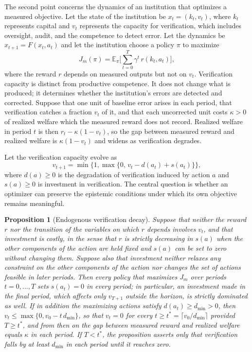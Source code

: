 \documentclass[11pt]{article}
\newtheorem{proposition}{Proposition}
\theoremstyle{definition}
\theoremstyle{remark}
\newcommand{\E}{\mathbb{E}}
\begin{document}
The second point concerns the dynamics of an institution that optimizes a measured objective. Let the state of the institution be $x_t=(k_t,v_t)$, where $k_t$ represents capital and $v_t$ represents the capacity for verification, which includes oversight, audit, and the competence to detect error. Let the dynamics be $x_{t+1}=F(x_t,a_t)$ and let the institution choose a policy $\pi$ to maximize
\begin{equation}
J_m(\pi)=\E_\pi\Big[\sum_{t=0}^{T}\gamma^{t}\,r(k_t,a_t)\Big],
\end{equation}
where the reward $r$ depends on measured outputs but not on $v_t$. Verification capacity is distinct from productive competence. It does not change what is produced; it determines whether the institution's errors are detected and corrected. Suppose that one unit of baseline error arises in each period, that verification catches a fraction $v_t$ of it, and that each uncorrected unit costs $\kappa>0$ of realized welfare which the measured reward does not record. Realized welfare in period $t$ is then $r_t-\kappa(1-v_t)$, so the gap between measured reward and realized welfare is $\kappa(1-v_t)$ and widens as verification degrades.

Let the verification capacity evolve as
\begin{equation}
v_{t+1}=\min\{1,\max\{0,\,v_t-d(a_t)+s(a_t)\}\},
\end{equation}
where $d(a)\ge0$ is the degradation of verification induced by action $a$ and $s(a)\ge0$ is investment in verification. The central question is whether an optimizer can preserve the epistemic conditions under which its own objective remains meaningful.

\begin{proposition}[Endogenous verification decay]
\label{prop:decay}
Suppose that neither the reward $r$ nor the transition of the variables on which $r$ depends involves $v_t$, and that investment is costly, in the sense that $r$ is strictly decreasing in $s(a)$ when the other components of the action are held fixed and $s(a)$ can be set to zero without changing them. Suppose also that investment neither relaxes any constraint on the other components of the action nor changes the set of actions feasible in later periods. Then every policy that maximizes $J_m$ over periods $t=0,\dots,T$ sets $s(a_t)=0$ in every period; in particular, an investment made in the final period, which affects only $v_{T+1}$ outside the horizon, is strictly dominated as well. If in addition the maximizing actions satisfy $d(a_t)\ge d_{\min}>0$, then $v_t\le\max\{0,v_0-t\,d_{\min}\}$, so that $v_t=0$ for every $t\ge t^{*}=\lceil v_0/d_{\min}\rceil$ provided $T\ge t^{*}$, and from then on the gap between measured reward and realized welfare equals $\kappa$ in each period. If $T<t^{*}$, the proposition asserts only that verification falls by at least $d_{\min}$ in each period until it reaches zero.
\end{proposition}
\end{document}
